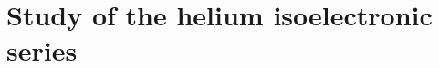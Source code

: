 \documentclass[aip,jcp,reprint,noshowkeys,superscriptaddress]{revtex4-1}
\begin{document}
\section{Study of the helium isoelectronic series}
\end{document}
